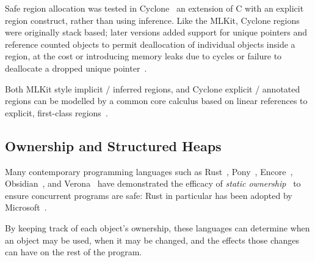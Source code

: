 Safe region allocation was tested in
Cyclone~\cite{grossman_region-based_2002} an extension of C
with an explicit region construct, rather than using
inference. Like the MLKit, Cyclone regions were originally stack
based; later versions added support for unique pointers and
reference counted objects to permit deallocation of individual
objects inside a region, at the cost or introducing memory leaks
due to cycles or failure to deallocate a dropped unique
pointer~\cite{cyclone-ismm2004}.

Both MLKit style implicit /
inferred regions, and Cyclone explicit / annotated regions can be
modelled by a common core calculus based on linear references to
explicit, first-class
regions~\cite{fluet-linear-regions-esop2006}.




\subsection{Ownership and Structured Heaps}

Many 
contemporary programming languages such as
Rust~\cite{RustBook}, Pony~\cite{PonyTS},
Encore~\cite{EncoreTS},
Obsidian~\cite{aldrichObsidianStudy2020}, and
Verona~\cite{Verona} 
have demonstrated the efficacy of \textit{static
  ownership}~\cite{ClaPotNobOOPSLA98,noble_flexible_1998} %
to ensure
concurrent programs are safe: Rust in particular has been adopted by
Microsoft~\cite{RustPopular,MSRust}.

By keeping track of each object's
ownership, these languages can determine when an object may be used,
when it may be changed, and the effects those changes can have on the
rest of the program. 


